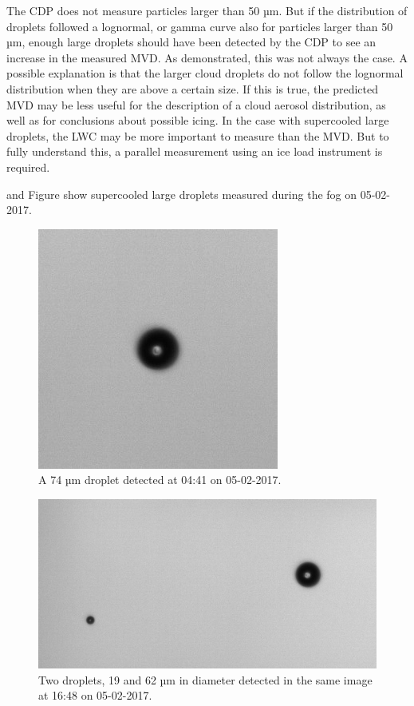 The CDP does not measure particles larger than 50 µm. But if the distribution of droplets followed a lognormal, or gamma curve \cite{miles2000,lee2010} also for particles larger than 50 µm, enough large droplets should have been detected by the CDP to see an increase in the measured MVD. As demonstrated, this was not always the case. A possible explanation is that the larger cloud droplets do not follow the lognormal distribution when they are above a certain size. If this is true, the predicted MVD may be less useful for the description of a cloud aerosol distribution, as well as for conclusions about possible icing. In the case with supercooled large droplets, the LWC may be more important to measure than the MVD. But to fully understand this, a parallel measurement using an ice load instrument is required.

 and Figure  show supercooled large droplets measured during the fog on 05-02-2017.

\begin{figure}[ht]
  \centering
  \includegraphics[width=0.4\linewidth]{figures/170205_0441_droplet_74um}
\caption{A 74 µm droplet detected at 04:41 on 05-02-2017.}
\label{fig:170505_0441_droplet}
\end{figure}
\begin{figure}[ht]
  \centering
  \includegraphics[width=0.8\linewidth]{figures/170205_1648_droplet_19and62um}
\caption{Two droplets, 19 and 62 µm in diameter detected in the same image at 16:48 on 05-02-2017.}
\label{fig:170505_1648_droplet}
\end{figure}



